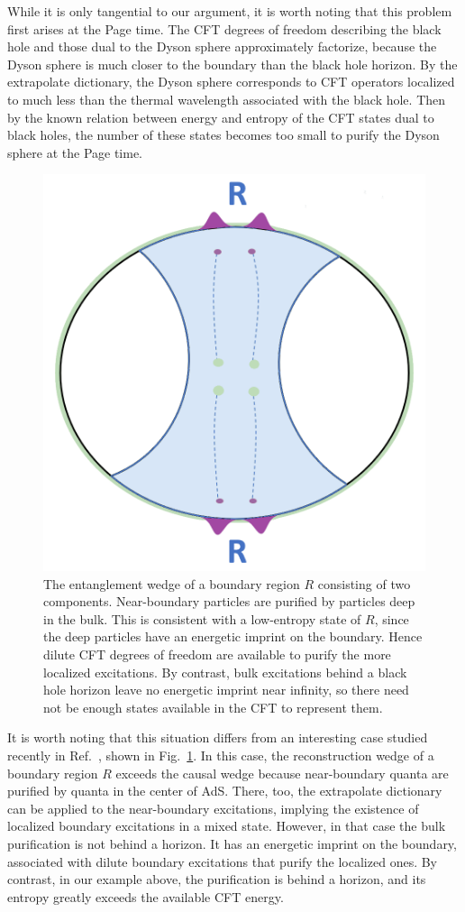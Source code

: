 \documentclass[12pt,letterpaper]{article}
\begin{document}
While it is only tangential to our argument, it is worth noting that this problem first arises at the Page time. The CFT degrees of freedom describing the black hole and those dual to the Dyson sphere approximately factorize, because the Dyson sphere is much closer to the boundary than the black hole horizon. By the extrapolate dictionary, the Dyson sphere corresponds to CFT operators localized to much less than the thermal wavelength associated with the black hole. Then by the known relation between energy and entropy of the CFT states dual to black holes, the number of these states becomes too small to purify the Dyson sphere at the Page time.
\begin{figure}%
    \centering
    \includegraphics[width=.5\textwidth]{ears2}
    \caption{The entanglement wedge of a boundary region $R$ consisting of two components. Near-boundary particles are purified by particles deep in the bulk. This is consistent with a low-entropy state of $R$, since the deep particles have an energetic imprint on the boundary. Hence dilute CFT degrees of freedom are available to purify the more localized excitations. By contrast, bulk excitations behind a black hole horizon leave no energetic imprint near infinity, so there need not be enough states available in the CFT to represent them.}%
    \label{fig-twointervals}%
\end{figure}

It is worth noting that this situation differs from an interesting case studied recently in Ref.~\cite{AkeLev19}, shown in Fig.~\ref{fig-twointervals}.  In this case, the reconstruction wedge of a boundary region $R$ exceeds the causal wedge because near-boundary quanta are purified by quanta in the center of AdS. There, too, the extrapolate dictionary can be applied to the near-boundary excitations, implying the existence of localized boundary excitations in a mixed state. However, in that case the bulk purification is not behind a horizon. It has an energetic imprint on the boundary, associated with dilute boundary excitations that purify the localized ones. By contrast, in our example above, the purification is behind a horizon, and its entropy greatly exceeds the available CFT energy.
\end{document}
